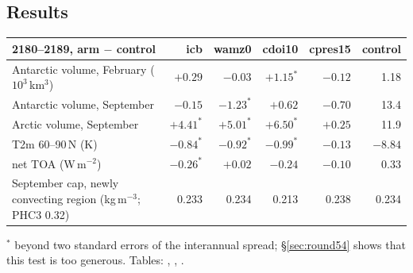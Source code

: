 \documentclass[10pt]{article}
\begin{document}
\subsection{Results}\label{sub:r53res}

\begin{center}\small
\begin{tabular}{lrrrrr}
\toprule
2180--2189, arm $-$ control & icb & wamz0 & cdoi10 & cpres15 & control \\
\midrule
Antarctic volume, February ($10^3$\,km$^3$) & $+0.29$ & $-0.03$ & $+1.15^*$ & $-0.12$ & 1.18 \\
Antarctic volume, September & $-0.15$ & $-1.23^*$ & $+0.62$ & $-0.70$ & 13.4 \\
Arctic volume, September & $+4.41^*$ & $+5.01^*$ & $+6.50^*$ & $+0.25$ & 11.9 \\
T2m 60--90\,N (K) & $-0.84^*$ & $-0.92^*$ & $-0.99^*$ & $-0.13$ & $-8.84$ \\
net TOA (W\,m$^{-2}$) & $-0.26^*$ & $+0.02$ & $-0.24$ & $-0.10$ & 0.33 \\
September cap, newly convecting region (kg\,m$^{-3}$; PHC3 0.32) & 0.233 & 0.234 & 0.213 & 0.238 & 0.234 \\
\bottomrule
\end{tabular}
\end{center}

\noindent $^*$ beyond two standard errors of the interannual spread; \S\ref{sec:round54} shows that this
test is too generous. Tables: ,
, .
\end{document}
